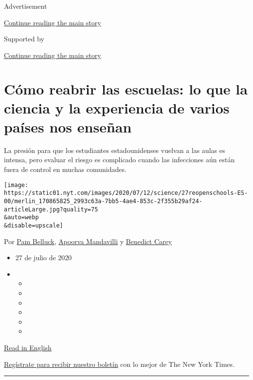 Advertisement

\protect\hyperlink{after-top}{Continue reading the main story}

Supported by

\protect\hyperlink{after-sponsor}{Continue reading the main story}

\hypertarget{cuxf3mo-reabrir-las-escuelas-lo-que-la-ciencia-y-la-experiencia-de-varios-pauxedses-nos-enseuxf1an}{%
\section{Cómo reabrir las escuelas: lo que la ciencia y la experiencia
de varios países nos
enseñan}\label{cuxf3mo-reabrir-las-escuelas-lo-que-la-ciencia-y-la-experiencia-de-varios-pauxedses-nos-enseuxf1an}}

La presión para que los estudiantes estadounidenses vuelvan a las aulas
es intensa, pero evaluar el riesgo es complicado cuando las infecciones
aún están fuera de control en muchas comunidades.

\texttt{[image: https://static01.nyt.com/images/2020/07/12/science/27reopenschools-ES-00/merlin\_170865825\_2993c63a-7bb5-4ae4-853c-2f355b29af24-articleLarge.jpg?quality=75\\\&auto=webp\\\&disable=upscale]}

Por \href{https://www.nytimes.com/by/pam-belluck}{Pam Belluck},
\href{https://www.nytimes.com/by/apoorva-mandavilli}{Apoorva Mandavilli}
y \href{https://www.nytimes.com/by/benedict-carey}{Benedict Carey}

\begin{itemize}
\item
  27 de julio de 2020
\item
  \begin{itemize}
  \item
  \item
  \item
  \item
  \item
  \item
  \end{itemize}
\end{itemize}

\href{https://www.nytimes.com/2020/07/11/health/coronavirus-schools-reopen.html}{Read
in English}

\href{https://www.nytimes.com/newsletters/el-times}{Regístrate para
recibir nuestro boletín} con lo mejor de The New York Times.

\begin{center}\rule{0.5\linewidth}{\linethickness}\end{center}

